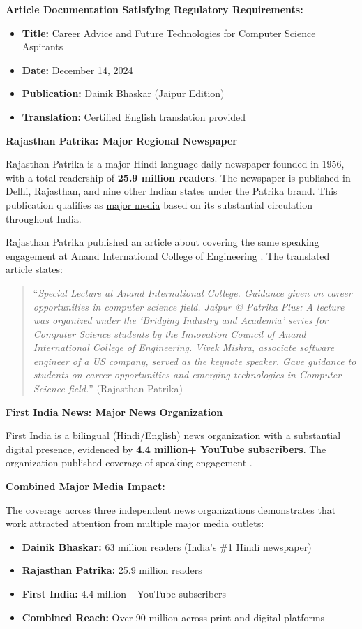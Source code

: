 \textbf{Article Documentation Satisfying Regulatory Requirements:}
\begin{itemize}
    \item \textbf{Title:} Career Advice and Future Technologies for Computer Science Aspirants
    \item \textbf{Date:} December 14, 2024
    \item \textbf{Publication:} Dainik Bhaskar (Jaipur Edition)
    \item \textbf{Translation:} Certified English translation provided
\end{itemize}

\textbf{Rajasthan Patrika: Major Regional Newspaper}

Rajasthan Patrika is a major Hindi-language daily newspaper founded in 1956, with a total readership of \textbf{25.9 million readers}. The newspaper is published in Delhi, Rajasthan, and nine other Indian states under the Patrika brand. This publication qualifies as \underline{major media} based on its substantial circulation throughout India.

Rajasthan Patrika published an article about \dr covering the same speaking engagement at Anand International College of Engineering \cite{PM7}. The translated article states:

\begin{quote}
``\textit{Special Lecture at Anand International College. Guidance given on career opportunities in computer science field. Jaipur @ Patrika Plus: A lecture was organized under the `Bridging Industry and Academia' series for Computer Science students by the Innovation Council of Anand International College of Engineering. Vivek Mishra, associate software engineer of a US company, served as the keynote speaker. Gave guidance to students on career opportunities and emerging technologies in Computer Science field.}'' (Rajasthan Patrika)
\end{quote}

\textbf{First India News: Major News Organization}

First India is a bilingual (Hindi/English) news organization with a substantial digital presence, evidenced by \textbf{4.4 million+ YouTube subscribers}. The organization published coverage of \drs speaking engagement \cite{PM8}.

\textbf{Combined Major Media Impact:}

The coverage across three independent news organizations demonstrates that \drs work attracted attention from multiple major media outlets:
\begin{itemize}
    \item \textbf{Dainik Bhaskar:} 63 million readers (India's \#1 Hindi newspaper)
    \item \textbf{Rajasthan Patrika:} 25.9 million readers
    \item \textbf{First India:} 4.4 million+ YouTube subscribers
    \item \textbf{Combined Reach:} Over 90 million across print and digital platforms
\end{itemize}


